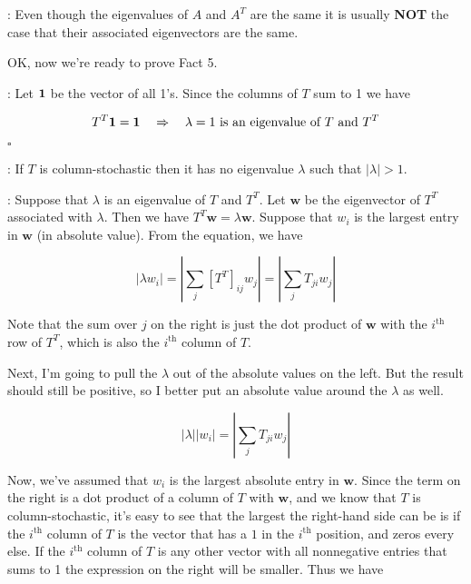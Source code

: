 \documentclass[12pt]{article}
\newcommand{\nin}{\noindent}
\newcommand{\vthree}{\vspace{3mm}}
\newcommand{\myab}[1]{\left| #1 \right|}
\newcommand{\bw}{\mathbf{w}}
\begin{document}
\vthree

\nin {\bf Caveat}: Even though the eigenvalues of $A$ and $A^T$ are the same it is usually {\bf NOT} the case that their associated eigenvectors are the same.

\vthree

\nin OK, now we're ready to prove Fact 5.

\vthree

\nin {\bf Proof}: Let ${\bf 1}$ be the vector of all 1's.  Since the columns of $T$ sum to 1 we have

\[
T^T{\bf 1} = {\bf 1} \quad \Rightarrow \quad \lambda = 1 \textrm{ is an eigenvalue of } T \textrm{ and } T^T
\]

\hfill $\square$

\vthree

\nin {\bf Fact 6}: If $T$ is column-stochastic then it has no eigenvalue $\lambda$ such that $\myab{\lambda} > 1$.

\nin {\bf Proof}:  Suppose that $\lambda$ is an eigenvalue of $T$ and $T^T$.  Let $\bw$ be the eigenvector of $T^T$ associated with $\lambda$.  Then we have $T^T\bw = \lambda \bw$.  Suppose that $w_i$ is the largest entry in $\bw$ (in absolute value).  From the equation, we have

\[
\myab{\lambda w_i} = \myab{\sum_j [T^T]_{ij} w_j} = \myab{\sum_j T_{ji} w_j}
\]

\vthree

\nin Note that the sum over $j$ on the right is just the dot product of $\bw$ with the $i^\textrm{th}$ row of $T^T$, which is also the $i^\textrm{th}$ column of $T$.

\nin Next, I'm going to pull the $\lambda$ out of the absolute values on the left.  But the result should still be positive, so I better put an absolute value around the $\lambda$ as well.

\[
\myab{\lambda} \myab{w_i} = \myab{\sum_j T_{ji} w_j}
\]

\vthree

\nin Now, we've assumed that $w_i$ is the largest absolute entry in $\bw$.  Since the term on the right is a dot product of a column of $T$ with $\bw$, and we know that $T$ is column-stochastic, it's easy to see that the largest the right-hand side can be is if the $i^\textrm{th}$ column of $T$ is the vector that has a $1$ in the $i^\textrm{th}$ position, and zeros every else.  If the $i^\textrm{th}$ column of $T$ is any other vector with all nonnegative entries that sums to 1 the expression on the right will be smaller.  Thus we have
\end{document}
